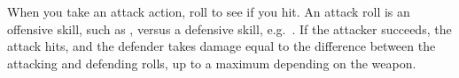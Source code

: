 
When you take an attack action, roll to see if you hit. An attack roll is an offensive skill, such as , versus a defensive skill, e.g.\ . If the attacker succeeds, the attack hits, and the defender takes damage equal to the difference between the attacking and defending rolls, up to a maximum depending on the weapon.
